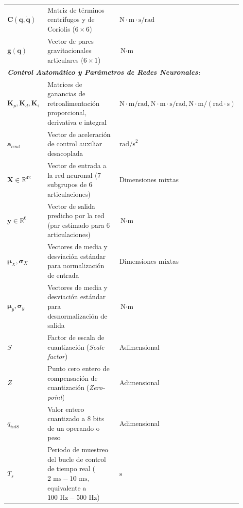 \documentclass[12pt]{article}
\begin{document}
\begin{longtable}{p{0.20\linewidth} p{0.62\linewidth} p{0.14\linewidth}}
$\bm{C}(\bm{q},\dot{\bm{q}})$ & Matriz de términos centrífugos y de Coriolis ($6 \times 6$) & $\text{N}\cdot\text{m}\cdot\text{s/rad}$ \\
$\bm{g}(\bm{q})$ & Vector de pares gravitacionales articulares ($6 \times 1$) & $\text{N}\cdot\text{m}$ \\
\midrule
\multicolumn{3}{l}{\textit{\textbf{Control Automático y Parámetros de Redes Neuronales:}}} \\
$\bm{K}_p, \bm{K}_d, \bm{K}_i$ & Matrices de ganancias de retroalimentación proporcional, derivativa e integral & $\text{N}\cdot\text{m/rad}, \text{N}\cdot\text{m}\cdot\text{s/rad}, \text{N}\cdot\text{m}/(\text{rad}\cdot\text{s})$ \\
$\bm{a}_{cmd}$ & Vector de aceleración de control auxiliar desacoplada & $\text{rad/s}^2$ \\
$\bm{X} \in \mathbb{R}^{42}$ & Vector de entrada a la red neuronal (7 subgrupos de 6 articulaciones) & Dimensiones mixtas \\
$\bm{y} \in \mathbb{R}^{6}$ & Vector de salida predicho por la red (par estimado para 6 articulaciones) & $\text{N}\cdot\text{m}$ \\
$\bm{\mu}_X, \bm{\sigma}_X$ & Vectores de media y desviación estándar para normalización de entrada & Dimensiones mixtas \\
$\bm{\mu}_y, \bm{\sigma}_y$ & Vectores de media y desviación estándar para desnormalización de salida & $\text{N}\cdot\text{m}$ \\
$S$ & Factor de escala de cuantización (\textit{Scale factor}) & Adimensional \\
$Z$ & Punto cero entero de compensación de cuantización (\textit{Zero-point}) & Adimensional \\
$q_{int8}$ & Valor entero cuantizado a 8 bits de un operando o peso & Adimensional \\
$T_s$ & Periodo de muestreo del bucle de control de tiempo real ($2\text{ ms} - 10\text{ ms}$, equivalente a $100\text{ Hz} - 500\text{ Hz}$) & $\text{s}$ \\
\end{longtable}


\newpage
{}
\end{document}
